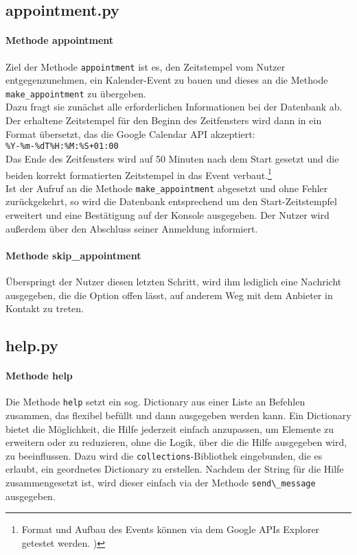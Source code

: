         \subsection{appointment.py} \label{appointment.py}
            \paragraph{Methode appointment}
                Ziel der Methode \verb|appointment| ist es, den Zeitstempel vom Nutzer entgegenzunehmen, ein Kalender-Event zu bauen und dieses an die Methode \verb|make_appointment| zu übergeben. \\
                Dazu fragt sie zunächst alle erforderlichen Informationen bei der Datenbank ab. Der erhaltene Zeitstempel für den Beginn des Zeitfensters wird dann in ein Format übersetzt, das die Google Calendar API akzeptiert: \\ 
                \verb/%Y-%m-%dT%H:%M:%S+01:00/ \\
                Das Ende des Zeitfensters wird auf 50 Minuten nach dem Start gesetzt und die beiden korrekt formatierten Zeitstempel in das Event verbaut.\footnote{Format und Aufbau des Events können via dem Google APIs Explorer getestet werden. \cite{apiExplorer})} \\
                Ist der Aufruf an die Methode \verb|make_appointment| abgesetzt und ohne Fehler zurückgekehrt, so wird die Datenbank entsprechend um den Start-Zeitstempfel erweitert und eine Bestätigung auf der Konsole ausgegeben. Der Nutzer wird außerdem über den Abschluss seiner Anmeldung informiert. 

            \paragraph{Methode skip\_appointment}
                Überspringt der Nutzer diesen letzten Schritt, wird ihm lediglich eine Nachricht ausgegeben, die die Option offen lässt, auf anderem Weg mit dem Anbieter in Kontakt zu treten.

        
        \subsection{help.py} \label{help.py}
            \paragraph{Methode help}
                Die Methode \verb|help| setzt ein sog. Dictionary aus einer Liste an Befehlen zusammen, das flexibel befüllt und dann ausgegeben werden kann. Ein Dictionary bietet die Möglichkeit, die Hilfe jederzeit einfach anzupassen, um Elemente zu erweitern oder zu reduzieren, ohne die Logik, über die die Hilfe ausgegeben wird, zu beeinflussen. Dazu wird die \verb|collections|-Bibliothek eingebunden, die es erlaubt, ein geordnetes Dictionary zu erstellen. Nachdem der String für die Hilfe zusammengesetzt ist, wird dieser einfach via der Methode \verb|send\_message| ausgegeben.


